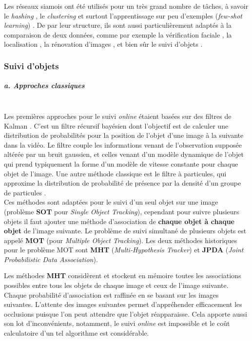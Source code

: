 \documentclass[10pt,twocolumn,letterpaper,french]{article}
\begin{document}
Les réseaux siamois ont été utilisés pour un très grand nombre de tâches, à savoir le \textit{hashing} \cite{hashing}, le \textit{clustering} \cite{clustering} et surtout l'apprentissage sur peu d'exemples (\textit{few-shot learning}) \cite{one-shot}. De par leur structure, ils sont aussi particulièrement adaptés à la comparaison de deux données, comme par exemple la vérification faciale \cite{face_verif}, la localisation \cite{tompson2015efficient}, la rénovation d'images \cite{gordo2017endtoend}, et bien sûr le suivi d'objets \cite{siamfc, siamfcplusplus, siamMask, trackRCNN}.

\subsubsection*{Suivi d'objets}

\subparagraph{a. Approches classiques\\\\} 

Les premières approches pour le suivi \textit{online} étaient basées sur des filtres de Kalman \cite{Kalman}. C'est un filtre récursif bayésien dont l'objectif est de calculer une distribution de probabilités pour la position de l'objet d'une image à la suivante dans la vidéo. Le filtre couple les informations venant de l'observation supposée altérée par un bruit gaussien, et celles venant d'un modèle dynamique de l'objet qui prend typiquement la forme d'un modèle de vitesse constante pour chaque objet de l'image. Une autre méthode classique est le filtre à particules, qui approxime la distribution de probabilité de présence par la densité d'un groupe de particules \cite{particule}. \\

Ces méthodes sont adaptées pour le suivi d'un seul objet sur une image (problème \textbf{SOT} pour \textit{Single Object Tracking}), cependant pour suivre plusieurs objets il faut ajouter une méthode d'association de \textbf{chaque objet à chaque objet} de l'image suivante. Le problème de suivi simultané de plusieurs objets est appelé \textbf{MOT} (pour \textit{Multiple Object Tracking}). Les deux méthodes historiques pour le problème MOT sont \textbf{MHT} (\textit{Multi-Hypothesis Tracker}) et \textbf{JPDA} (\textit{Joint Probabilistic Data Association}).

Les méthodes \textbf{MHT} \cite{chenouardMHT, MHTrevisited} considèrent et stockent en mémoire toutes les associations possibles entre tous les objets de chaque image et ceux de l'image suivante. Chaque probabilité d'association est raffinée en se basant sur les images suivantes. L'attente des images suivantes permet d'appréhender efficacement les occlusions puisque l'on peut attendre que l'objet réapparaisse. Cela apporte aussi son lot d'inconvénients, notamment, le suivi \textit{online} est impossible et le coût calculatoire d'un tel algorithme est considérable.
\end{document}
